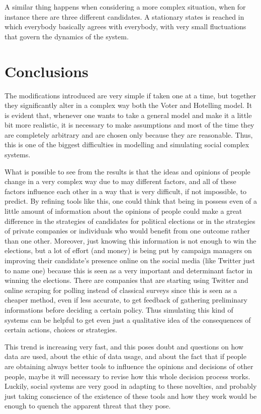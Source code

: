 \documentclass[11pt,a4paper,twocolumn]{article}
\begin{document}
A similar thing happens when considering a more complex situation, when for instance there are three different candidates.
A stationary states is reached in which everybody basically agrees with everybody, with very small fluctuations that govern the dynamics of the system. 





\section*{Conclusions}

The modifications introduced are very simple if taken one at a time, but together they significantly alter in a complex way both the Voter and Hotelling model.
It is evident that, whenever one wants to take a general model and make it a little bit more realistic, it is necessary to make assumptions and most of the time they are completely arbitrary and are chosen only because they are reasonable. Thus, this is one of the biggest difficulties in modelling and simulating social complex systems.

What is possible to see from the results is that the ideas and opinions of people change in a very complex way due to may different factors, and all of these factors influence each other in a way that is very difficult, if not impossible, to predict.
By refining tools like this, one could think that being in possess even of a little amount of information about the opinions of people could make a great difference in the strategies of candidates for political elections or in the strategies of private companies or individuals who would benefit from one outcome rather than one other. Moreover, just knowing this information is not enough to win the elections, but a lot of effort (and money) is being put by campaign managers on improving their candidate's presence online on the social media (like Twitter just to name one) because this is seen as a very important and determinant factor in winning the elections.
There are companies that are starting using Twitter and online scraping for polling instead of classical surveys since this is seen as a cheaper method, even if less accurate, to get feedback of gathering preliminary informations before deciding a certain policy.
Thus simulating this kind of systems can be helpful to get even just a qualitative idea of the consequences of certain actions, choices or strategies.

This trend is increasing very fast, and this poses doubt and questions on how data are used, about the ethic of data usage, and about the fact that if people are obtaining always better tools to influence the opinions and decisions of other people, maybe it will necessary to revise how this whole decision process works.
Luckily, social systems are very good in adapting to these novelties, and probably just taking conscience of the existence of these tools and how they work would be enough to quench the apparent threat that they pose. 
\end{document}
